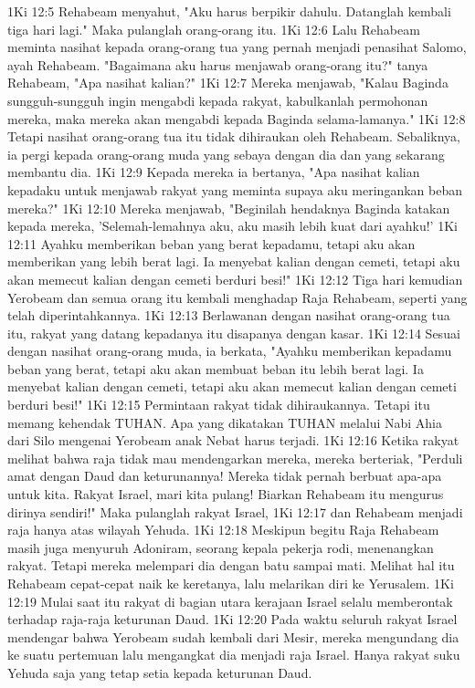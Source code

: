 1Ki 12:5  Rehabeam menyahut, "Aku harus berpikir dahulu. Datanglah kembali tiga hari lagi." Maka pulanglah orang-orang itu.
1Ki 12:6  Lalu Rehabeam meminta nasihat kepada orang-orang tua yang pernah menjadi penasihat Salomo, ayah Rehabeam. "Bagaimana aku harus menjawab orang-orang itu?" tanya Rehabeam, "Apa nasihat kalian?"
1Ki 12:7  Mereka menjawab, "Kalau Baginda sungguh-sungguh ingin mengabdi kepada rakyat, kabulkanlah permohonan mereka, maka mereka akan mengabdi kepada Baginda selama-lamanya."
1Ki 12:8  Tetapi nasihat orang-orang tua itu tidak dihiraukan oleh Rehabeam. Sebaliknya, ia pergi kepada orang-orang muda yang sebaya dengan dia dan yang sekarang membantu dia.
1Ki 12:9  Kepada mereka ia bertanya, "Apa nasihat kalian kepadaku untuk menjawab rakyat yang meminta supaya aku meringankan beban mereka?"
1Ki 12:10  Mereka menjawab, "Beginilah hendaknya Baginda katakan kepada mereka, 'Selemah-lemahnya aku, aku masih lebih kuat dari ayahku!'
1Ki 12:11  Ayahku memberikan beban yang berat kepadamu, tetapi aku akan memberikan yang lebih berat lagi. Ia menyebat kalian dengan cemeti, tetapi aku akan memecut kalian dengan cemeti berduri besi!"
1Ki 12:12  Tiga hari kemudian Yerobeam dan semua orang itu kembali menghadap Raja Rehabeam, seperti yang telah diperintahkannya.
1Ki 12:13  Berlawanan dengan nasihat orang-orang tua itu, rakyat yang datang kepadanya itu disapanya dengan kasar.
1Ki 12:14  Sesuai dengan nasihat orang-orang muda, ia berkata, "Ayahku memberikan kepadamu beban yang berat, tetapi aku akan membuat beban itu lebih berat lagi. Ia menyebat kalian dengan cemeti, tetapi aku akan memecut kalian dengan cemeti berduri besi!"
1Ki 12:15  Permintaan rakyat tidak dihiraukannya. Tetapi itu memang kehendak TUHAN. Apa yang dikatakan TUHAN melalui Nabi Ahia dari Silo mengenai Yerobeam anak Nebat harus terjadi.
1Ki 12:16  Ketika rakyat melihat bahwa raja tidak mau mendengarkan mereka, mereka berteriak, "Perduli amat dengan Daud dan keturunannya! Mereka tidak pernah berbuat apa-apa untuk kita. Rakyat Israel, mari kita pulang! Biarkan Rehabeam itu mengurus dirinya sendiri!" Maka pulanglah rakyat Israel,
1Ki 12:17  dan Rehabeam menjadi raja hanya atas wilayah Yehuda.
1Ki 12:18  Meskipun begitu Raja Rehabeam masih juga menyuruh Adoniram, seorang kepala pekerja rodi, menenangkan rakyat. Tetapi mereka melempari dia dengan batu sampai mati. Melihat hal itu Rehabeam cepat-cepat naik ke keretanya, lalu melarikan diri ke Yerusalem.
1Ki 12:19  Mulai saat itu rakyat di bagian utara kerajaan Israel selalu memberontak terhadap raja-raja keturunan Daud.
1Ki 12:20  Pada waktu seluruh rakyat Israel mendengar bahwa Yerobeam sudah kembali dari Mesir, mereka mengundang dia ke suatu pertemuan lalu mengangkat dia menjadi raja Israel. Hanya rakyat suku Yehuda saja yang tetap setia kepada keturunan Daud.
